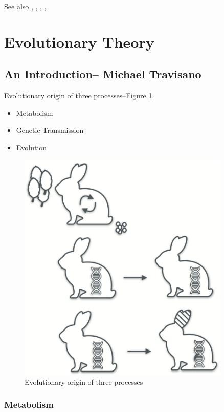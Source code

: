 \documentclass[]{article}
\begin{document}
See also   \cite{king1977symbiosis}, \cite{king1982recycling}, \cite{szathmary2000evolution},   \cite{virgo2016complex}, 
\section{Evolutionary Theory}

\subsection[An Introduction]{An Introduction-- Michael Travisano}


Evolutionary origin of three processes--Figure \ref{fig:EvolutionaryOrigin}.

\begin{itemize}
	\item Metabolism
	\item Genetic Transmission
	\item Evolution
\end{itemize}

\begin{figure}[H]
	\caption{Evolutionary origin of three processes}\label{fig:EvolutionaryOrigin}
	\includegraphics[width=0.9\textwidth]{EvolutionaryOrigin}
\end{figure}

\subsubsection{Metabolism}
\end{document}
